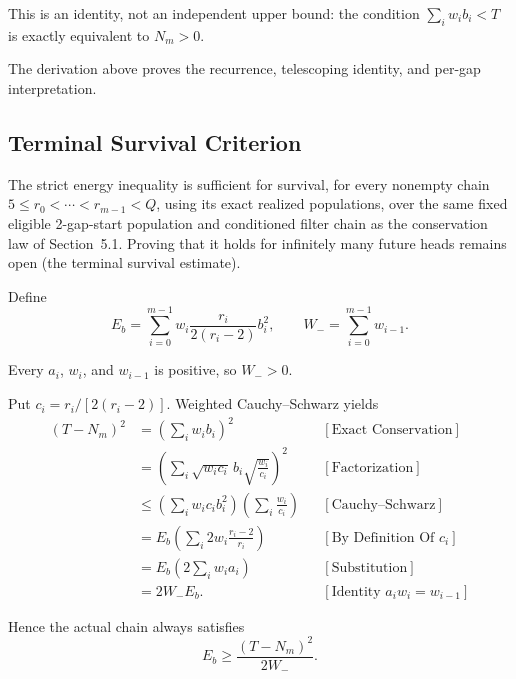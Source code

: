 This is an identity, not an independent upper bound: the condition
$\sum_iw_ib_i\lt T$ is exactly equivalent to $N_m>0$.

{\raggedright
The derivation above proves the recurrence, telescoping identity, and per-gap
interpretation. \par}

\subsection{Terminal Survival Criterion}
\label{sec:terminal-survival-criterion}

The strict energy inequality is sufficient for survival, for every nonempty
chain $5\le r_0\lt\cdots\lt r_{m-1}\lt Q$, using its exact realized
populations, over the same fixed eligible 2-gap-start population and
conditioned filter chain as the conservation law of Section~5.1. Proving that it
holds for infinitely many future heads remains open (the terminal survival
estimate).

Define
\begin{equation*}
E_b=
\sum_{i=0}^{m-1}
w_i\frac{r_i}{2(r_i-2)}b_i^2,
\qquad
W_-=\sum_{i=0}^{m-1}w_{i-1}.
\end{equation*}

Every $a_i$, $w_i$, and $w_{i-1}$ is positive, so $W_->0$.

Put $c_i=r_i/[2(r_i-2)]$. Weighted Cauchy--Schwarz yields
\begin{equation*}
\begin{aligned}
(T-N_m)^2
&=\left(\sum_iw_ib_i\right)^2
&&[\text{Exact Conservation}]\\
&=\left(
  \sum_i\sqrt{w_ic_i}\,b_i
  \sqrt{\frac{w_i}{c_i}}
  \right)^2
&&[\text{Factorization}]\\
&\le
  \left(\sum_iw_ic_ib_i^2\right)
  \left(\sum_i\frac{w_i}{c_i}\right)
&&[\text{Cauchy--Schwarz}]\\
&=E_b
  \left(\sum_i2w_i\frac{r_i-2}{r_i}\right)
&&[\text{By Definition Of }c_i]\\
&=E_b\left(2\sum_iw_ia_i\right)
&&[\text{Substitution}]\\
&=2W_-E_b.
&&[\text{Identity }a_iw_i=w_{i-1}]
\end{aligned}
\end{equation*}

Hence the actual chain always satisfies
\begin{equation*}
E_b\ge\frac{(T-N_m)^2}{2W_-}.
\end{equation*}

